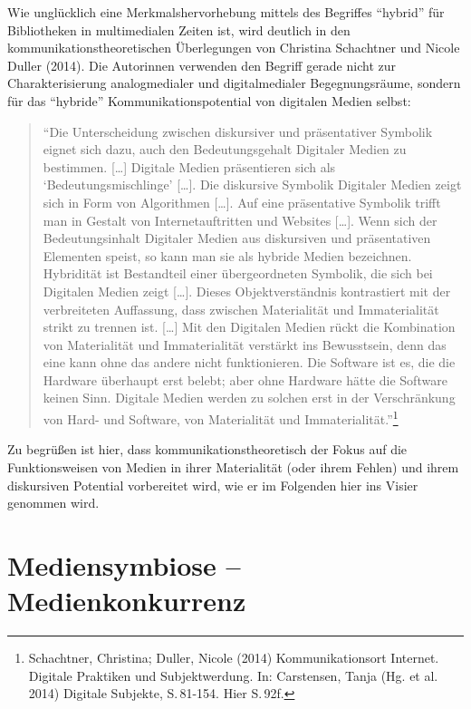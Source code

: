 \documentclass[a4paper,
fontsize=11pt,
oneside,
numbers=noperiodatend,
parskip=half-,
bibliography=totoc,
final
]{scrartcl}
\begin{document}
Wie unglücklich eine Merkmalshervorhebung mittels des Begriffes
\enquote{hybrid} für Bibliotheken in multimedialen Zeiten ist, wird
deutlich in den kommunikationstheoretischen Überlegungen von Christina
Schachtner und Nicole Duller (2014). Die Autorinnen verwenden den
Begriff gerade nicht zur Charakterisierung analogmedialer und
digitalmedialer Begegnungsräume, sondern für das \enquote{hybride}
Kommunikationspotential von digitalen Medien selbst:

\begin{quote}
\enquote{Die Unterscheidung zwischen diskursiver und präsentativer
Symbolik eignet sich dazu, auch den Bedeutungsgehalt Digitaler Medien zu
bestimmen. {[}\ldots{}{]} Digitale Medien präsentieren sich als
\enquote{Bedeutungsmischlinge} {[}\ldots{}{]}. Die diskursive Symbolik
Digitaler Medien zeigt sich in Form von Algorithmen {[}\ldots{}{]}. Auf
eine präsentative Symbolik trifft man in Gestalt von Internetauftritten
und Websites {[}\ldots{}{]}. Wenn sich der Bedeutungsinhalt Digitaler
Medien aus diskursiven und präsentativen Elementen speist, so kann man
sie als hybride Medien bezeichnen. Hybridität ist Bestandteil einer
übergeordneten Symbolik, die sich bei Digitalen Medien zeigt
{[}\ldots{}{]}. Dieses Objektverständnis kontrastiert mit der
verbreiteten Auffassung, dass zwischen Materialität und Immaterialität
strikt zu trennen ist. {[}\ldots{}{]} Mit den Digitalen Medien rückt die
Kombination von Materialität und Immaterialität verstärkt ins
Bewusstsein, denn das eine kann ohne das andere nicht funktionieren. Die
Software ist es, die die Hardware überhaupt erst belebt; aber ohne
Hardware hätte die Software keinen Sinn. Digitale Medien werden zu
solchen erst in der Verschränkung von Hard- und Software, von
Materialität und Immaterialität.}\footnote{Schachtner, Christina;
  Duller, Nicole (2014) Kommunikationsort Internet. Digitale Praktiken
  und Subjektwerdung. In: Carstensen, Tanja (Hg. et al. 2014) Digitale
  Subjekte, S.\,81-154. Hier S.\,92f.}
\end{quote}

Zu begrüßen ist hier, dass kommunikationstheoretisch der Fokus auf die
Funktionsweisen von Medien in ihrer Materialität (oder ihrem Fehlen) und
ihrem diskursiven Potential vorbereitet wird, wie er im Folgenden hier
ins Visier genommen wird.

\section*{Mediensymbiose --
Medienkonkurrenz}\label{mediensymbiose-medienkonkurrenz}
\end{document}

